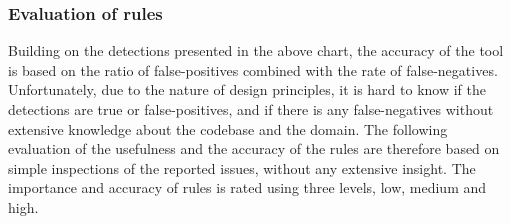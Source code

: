 \documentclass{report}
\begin{document}
\subsubsection{Evaluation of rules}
\label{rule-evaluation}
Building on the detections presented in the above chart, the accuracy of the tool is based on the ratio of false-positives combined with the rate of false-negatives. Unfortunately, due to the nature of design principles, it is hard to know if the detections are true or false-positives, and if there is any false-negatives without extensive knowledge about the codebase and the domain. The following evaluation of the usefulness and the accuracy of the rules are therefore based on simple inspections of the reported issues, without any extensive insight. The importance and accuracy of rules is rated using three levels, low, medium and high.
\end{document}
